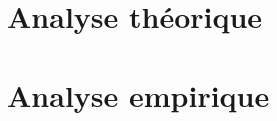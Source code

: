 





\section{Analyse théorique}
\subsection{} %
\subsection{} %
\subsection{} %
\subsection{} %
\subsection{} %

\section{Analyse empirique}
\subsection{} %
\subsection{} %


